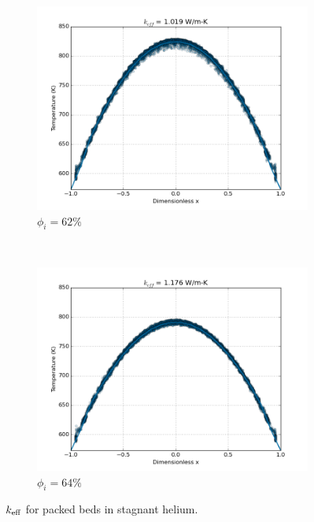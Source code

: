 \begin{figure}[!ht]
    \centering
    \begin{subfigure}[b]{0.45\textwidth}
        \centering
        \includegraphics[width=\textwidth]{figures/initial_packing_study/keff-cfd-62.png}
        \caption{$\phi_i = 62\%$}
    \end{subfigure}
    ~
    \begin{subfigure}[b]{0.45\textwidth}
        \centering
        \includegraphics[width=\textwidth]{figures/initial_packing_study/keff-cfd-64.png}
        \caption{$\phi_i = 64\%$}
    \end{subfigure}
    \caption{$k_\text{eff}$ for packed beds in stagnant helium.}
\label{fig:keff-cfd-initial}
\end{figure}

